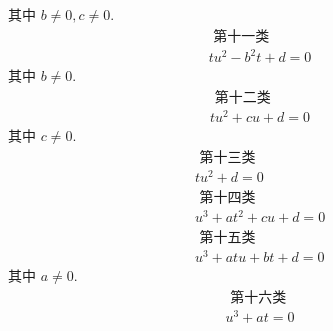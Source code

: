 其中 $b \neq 0, c \neq 0$.
\[
\begin{gathered}
\text { 第十一类 } \\
t u^{2}-b^{2} t+d=0
\end{gathered}
\]
其中 $b \neq 0$.
\[
\begin{gathered}
\text { 第十二类 } \\
t u^{2}+c u+d=0
\end{gathered}
\]
其中 $c \neq 0$.
\[
\begin{gathered}
\text { 第十三类 } \\
t u^{2}+d=0 \\
\text { 第十四类 } \\
u^{3}+a t^{2}+c u+d=0 \\
\text { 第十五类 } \\
u^{3}+a t u+b t+d=0
\end{gathered}
\]
其中 $a \neq 0$.
\[
\begin{gathered}
\text { 第十六类 } \\
u^{3}+a t=0
\end{gathered}
\]
